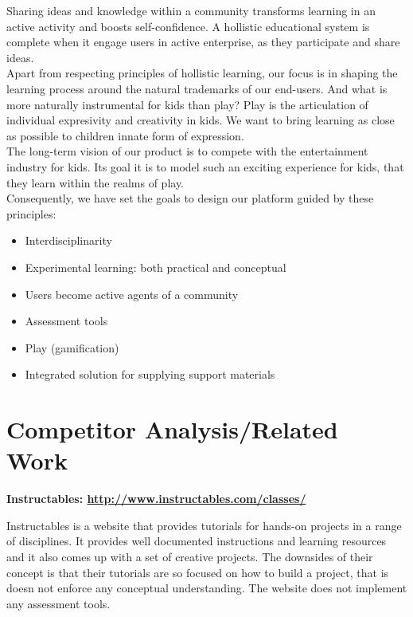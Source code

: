 Sharing ideas and knowledge within a community transforms learning in an active activity and boosts self-confidence. A hollistic educational system is complete when it engage users in active enterprise, as they participate and share ideas.\\

Apart from respecting principles of hollistic learning, our focus is in shaping the learning process around the natural trademarks of our end-users. And what is more naturally instrumental for kids than play? Play is the articulation of individual expresivity and creativity in kids. We want to bring learning as close as possible to children innate form of expression.\\ 

The long-term vision of our product is to compete with the entertainment industry for kids. Its goal it is to model such an exciting experience for kids, that they learn within the realms of play.\\

Consequently, we have set the goals to design our platform guided by these principles:
\begin{itemize}
\item Interdisciplinarity
\item Experimental learning: both practical and conceptual
\item Users become active agents of a community 
\item Assessment tools
\item Play (gamification)
\item Integrated solution for supplying support materials 
\end{itemize}

\section{Competitor Analysis/Related Work}

\textbf{Instructables: \url{http://www.instructables.com/classes/}}

Instructables is a website that provides tutorials for hands-on projects in a range of disciplines. It provides well documented instructions and learning resources and it also comes up with a set of creative projects.
The downsides of their concept is that their tutorials are so focused on how to build a project, that is doesn not enforce any conceptual understanding. The website does not implement any assessment tools.\\

